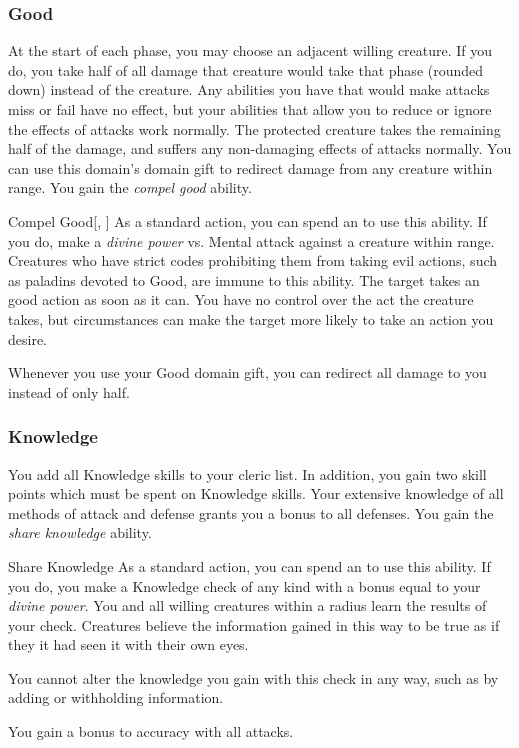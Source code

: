         \subsubsection{Good}
             At the start of each phase, you may choose an adjacent willing creature.
            If you do, you take half of all damage that creature would take that phase (rounded down) instead of the creature.
            Any abilities you have that would make attacks miss or fail have no effect, but your abilities that allow you to reduce or ignore the effects of attacks work normally.
            The protected creature takes the remaining half of the damage, and suffers any non-damaging effects of attacks normally.
             You can use this domain's domain gift to redirect damage from any creature within \rngclose range.
             You gain the \textit{compel good} ability.
            \begin{ability}{Compel Good}[, ]
                As a standard action, you can spend an  to use this ability.
                If you do, make a \textit{divine power} vs. Mental attack against a creature within \rngmed range.
                Creatures who have strict codes prohibiting them from taking evil actions, such as paladins devoted to Good, are immune to this ability.
                \hit The target takes an good action as soon as it can.
                You have no control over the act the creature takes, but circumstances can make the target more likely to take an action you desire.
            \end{ability}
             Whenever you use your Good domain gift, you can redirect all damage to you instead of only half.

        \subsubsection{Knowledge}
             You add all Knowledge skills to your cleric  list.
            In addition, you gain two skill points which must be spent on Knowledge skills.
             Your extensive knowledge of all methods of attack and defense grants you a  bonus to all defenses.
             You gain the \textit{share knowledge} ability.
            \begin{ability}{Share Knowledge}
                As a standard action, you can spend an  to use this ability.
                If you do, you make a Knowledge check of any kind with a bonus equal to your \textit{divine power}.
                You and all willing creatures within a \arealarge radius learn the results of your check.
                Creatures believe the information gained in this way to be true as if they it had seen it with their own eyes.

                You cannot alter the knowledge you gain with this check in any way, such as by adding or withholding information.
            \end{ability}
             You gain a  bonus to accuracy with all attacks.

